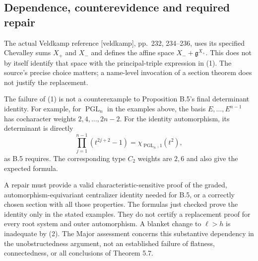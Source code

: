 \documentclass[10pt]{article}
\begin{document}
\subsection*{Dependence, counterevidence and required repair}
The actual Veldkamp reference [veldkamp], pp. 232, 234–236, uses its specified Chevalley sums \(X_+\) and \(X_-\) and defines the affine space \(X_-+\mathfrak g^{X_+}\). This does not by itself identify that space with the principal-triple expression in (1). The source’s precise choice matters; a name-level invocation of a section theorem does not justify the replacement.\par
The failure of (1) is not a counterexample to Proposition B.5’s final determinant identity. For example, for \(\operatorname{PGL}_n\) in the examples above, the basis \(E,\ldots,E^{n-1}\) has cocharacter weights \(2,4,\ldots,2n-2\). For the identity automorphism, its determinant is directly \[\prod_{j=1}^{n-1}(t^{2j+2}-1)=\chi_{\operatorname{PGL}_n,1}(t^2),\] as B.5 requires. The corresponding type \(C_2\) weights are \(2,6\) and also give the expected formula.\par
A repair must provide a valid characteristic-sensitive proof of the graded, automorphism-equivariant centralizer identity needed for B.5, or a correctly chosen section with all those properties. The formulas just checked prove the identity only in the stated examples. They do not certify a replacement proof for every root system and outer automorphism. A blanket change to \(\ell>h\) is inadequate by (2). The Major assessment concerns this substantive dependency in the unobstructedness argument, not an established failure of flatness, connectedness, or all conclusions of Theorem 5.7.\par
\end{document}
